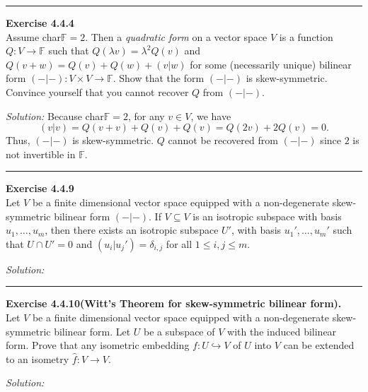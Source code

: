\documentclass[a4paper, 12pt]{article}
\newenvironment{problem}[2][Exercise]
    { \begin{mdframed}[backgroundcolor=gray!20] \textbf{#1 #2} \\}
    {  \end{mdframed}}
\newenvironment{solution}
    {\textit{Solution:}}
    {}
\begin{document}
\noindent\rule{7in}{2.8pt}

\begin{problem}{4.4.4}
Assume char\(\mathbb{F}=2\). Then a \textit{quadratic form} on a vector space \(V\) is a function \(Q:V\rightarrow \mathbb{F}\) such that \(Q(\lambda v)=\lambda^2 Q(v)\) and \(Q(v+w)=Q(v)+Q(w)+(v|w)\) for some 
(necessarily unique) bilinear form \((-|-):V\times V\rightarrow \mathbb{F}\). Show that the form \((-|-)\) is skew-symmetric. Convince yourself that you cannot recover \(Q\) from \((-|-)\).
\end{problem}
\begin{solution}
Because char\(\mathbb{F}=2\), for any \(v\in V\), we have 
\[(v|v)=Q(v+v)+Q(v)+Q(v)=Q(2v)+2Q(v)=0.\]
Thus, \((-|-)\) is skew-symmetric. \(Q\) cannot be recovered from \((-|-)\) since \(2\) is not invertible in \(\mathbb{F}\).
\end{solution}

\noindent\rule{7in}{2.8pt}
\begin{problem}{4.4.9}
Let \(V\) be a finite dimensional vector space equipped with a non-degenerate skew-symmetric bilinear form \((-|-)\). If \(V\subseteq V\) is an isotropic subspace with 
basis \(u_1,\ldots,u_m\), then there exists an isotropic subspace \(U'\), with basis \(u_1',\ldots,u_m'\) such that \(U\cap U'=0\) and \((u_i|u_j')=\delta_{i,j}\) for all \(1\leq i,j\leq m\).
\end{problem}
\begin{solution}
	
\end{solution}

\noindent\rule{7in}{2.8pt}


\begin{problem}{4.4.10(Witt's Theorem for skew-symmetric bilinear form).}
Let \(V\) be a finite dimensional vector space equipped with a non-degenerate skew-symmetric bilinear form. Let \(U\) be a subspace of \(V\) with the induced bilinear form. Prove that any isometric embedding 
\(f:U\hookrightarrow V\) of \(U\) into \(V\) can be extended to an isometry \(\hat{f}:V\rightarrow V\).
\end{problem}
\begin{solution}
	
\end{solution}
\end{document}
